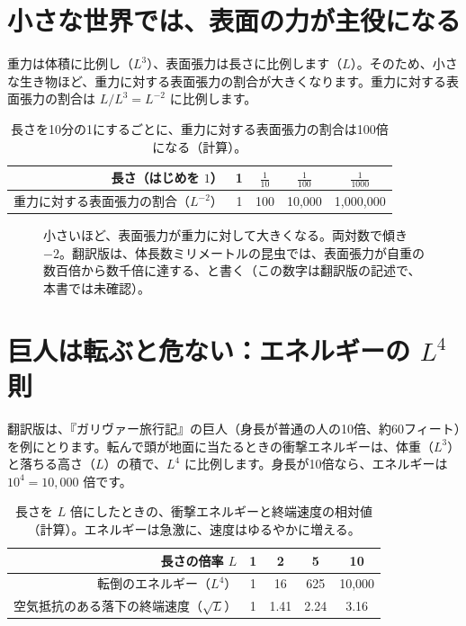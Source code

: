 \documentclass[a4paper,11pt,openany]{ltjsbook}
\begin{document}
\section{小さな世界では、表面の力が主役になる}

重力は体積に比例し（$L^3$）、表面張力は長さに比例します（$L$）。そのため、小さな生き物ほど、重力に対する表面張力の割合が大きくなります。重力に対する表面張力の割合は $L/L^3=L^{-2}$ に比例します。

\begin{table}[htbp]
\centering
\begin{tabular}{r|cccc}
\toprule
長さ（はじめを $1$） & 1 & $\tfrac1{10}$ & $\tfrac1{100}$ & $\tfrac1{1000}$\\
\midrule
重力に対する表面張力の割合（$L^{-2}$） & 1 & 100 & 10{,}000 & 1{,}000{,}000\\
\bottomrule
\end{tabular}
\caption{長さを10分の1にするごとに、重力に対する表面張力の割合は100倍になる（計算）。}
\end{table}

\begin{figure}[htbp]
\centering
{}
\caption{小さいほど、表面張力が重力に対して大きくなる。両対数で傾き $-2$。翻訳版は、体長数ミリメートルの昆虫では、表面張力が自重の数百倍から数千倍に達する、と書く（この数字は翻訳版の記述で、本書では未確認）。}
\end{figure}

\section{巨人は転ぶと危ない：エネルギーの $L^4$ 則}

翻訳版は、『ガリヴァー旅行記』の巨人（身長が普通の人の10倍、約60フィート）を例にとります。転んで頭が地面に当たるときの衝撃エネルギーは、体重（$L^3$）と落ちる高さ（$L$）の積で、$L^4$ に比例します。身長が10倍なら、エネルギーは $10^4=10{,}000$ 倍です。

\begin{table}[htbp]
\centering
\begin{tabular}{r|cccc}
\toprule
長さの倍率 $L$ & 1 & 2 & 5 & 10\\
\midrule
転倒のエネルギー（$L^4$） & 1 & 16 & 625 & 10{,}000\\
空気抵抗のある落下の終端速度（$\sqrt L$） & 1 & 1.41 & 2.24 & 3.16\\
\bottomrule
\end{tabular}
\caption{長さを $L$ 倍にしたときの、衝撃エネルギーと終端速度の相対値（計算）。エネルギーは急激に、速度はゆるやかに増える。}
\end{table}
\end{document}
